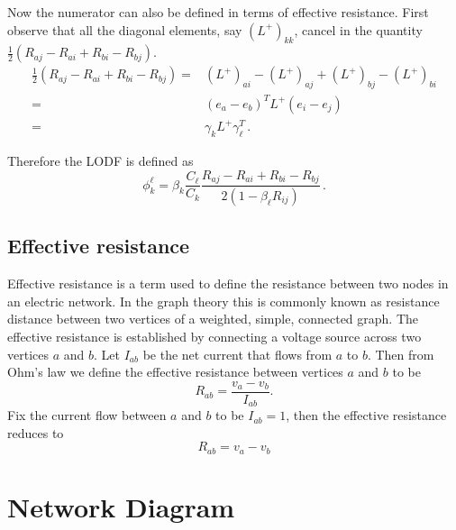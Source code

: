 \documentclass{article}
\begin{document}
Now the numerator can also be defined in terms of effective resistance. First observe that all the diagonal elements, say $(L^+)_{kk}$, cancel in the quantity $\frac{1}{2}(R_{aj}-R_{ai}+R_{bi}-R_{bj})$.  
\[\begin{aligned}
\frac{1}{2}(R_{aj}-R_{ai}+R_{bi}-R_{bj}) =& (L^+)_{ai}-(L^+)_{aj}+(L^+)_{bj}-(L^+)_{bi}\\
=& (e_a-e_b)^TL^+(e_i-e_j)\\
=& \gamma_kL^+\gamma_\ell^T\,.
\end{aligned}\]

Therefore the LODF is defined as
\[\phi_k^{\ell} = \beta_k \frac{C_\ell}{C_k} \frac{R_{aj}-R_{ai}+R_{bi}-R_{bj}}{2(1-\beta_\ell R_{ij})}\,.\]



\subsection{Effective resistance}
Effective resistance is a term used to define the resistance between two nodes in an electric network. In the graph theory this is commonly known as resistance distance between two vertices of a weighted, simple, connected graph. The effective resistance is established by connecting a voltage source across two vertices $a$ and $b$. Let $I_{ab}$ be the net current that flows from $a$ to $b$. Then from Ohm's law we define the effective resistance between vertices $a$ and $b$ to be
\[R_{ab} = \frac{v_a-v_b}{I_{ab}}.\] 
Fix the current flow between $a$ and $b$ to be $I_{ab}=1$, then the effective resistance reduces to 
\[R_{ab} =v_a-v_b\]
 



\section{Network Diagram}
\end{document}

